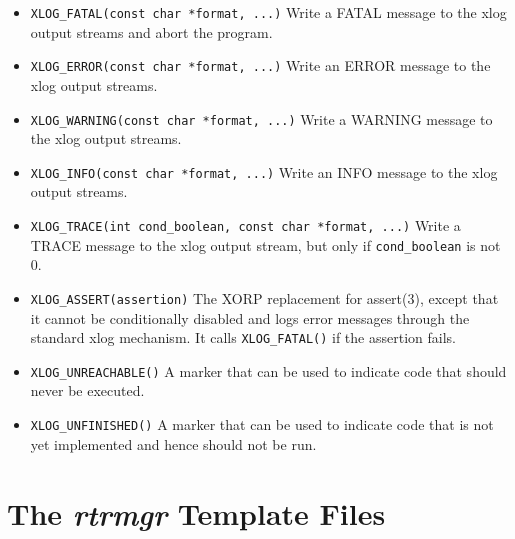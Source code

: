 \documentclass[11pt]{article}
\begin{document}
\begin{itemize}

  \item \verb=XLOG_FATAL(const char *format, ...)=
  \newline
  Write a FATAL message to the xlog output streams and abort the program.

  \item \verb=XLOG_ERROR(const char *format, ...)=
  \newline
  Write an ERROR message to the xlog output streams.

  \item \verb=XLOG_WARNING(const char *format, ...)=
  \newline
  Write a WARNING message to the xlog output streams.

  \item \verb=XLOG_INFO(const char *format, ...)=
  \newline
  Write an INFO message to the xlog output streams.

  \item \verb=XLOG_TRACE(int cond_boolean, const char *format, ...)=
  \newline
  Write a TRACE message to the xlog output stream, but only
  if \verb=cond_boolean= is not 0.

  \item \verb=XLOG_ASSERT(assertion)=
  \newline
  The XORP replacement for assert(3), except that it cannot be
  conditionally disabled and logs error messages through the standard
  xlog mechanism. It calls \verb=XLOG_FATAL()= if the assertion fails.

  \item \verb=XLOG_UNREACHABLE()=
  \newline
   A marker that can be used to indicate code that should never be executed.

  \item \verb=XLOG_UNFINISHED()=
  \newline
  A marker that can be used to indicate code that is not yet implemented
  and hence should not be run.

\end{itemize}

\newpage

\section{The {\it rtrmgr} Template Files}
\label{rtrmgr_templates}
\end{document}

